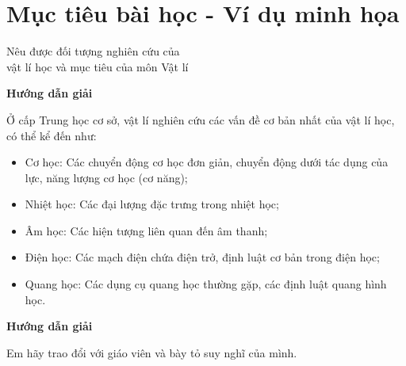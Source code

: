 \section{Mục tiêu bài học - Ví dụ minh họa}
\begin{dang}{Nêu được đối tượng nghiên cứu của\\ vật lí học và mục tiêu của môn Vật lí}
	{	\begin{center}
			\textbf{Hướng dẫn giải}
		\end{center}
		
		Ở cấp Trung học cơ sở, vật lí nghiên cứu các vấn đề cơ bản nhất của vật lí học, có thể kể đến như:
		\begin{itemize}
			\item Cơ học: Các chuyển động cơ học đơn giản, chuyển động dưới tác dụng của lực, năng lượng cơ học (cơ năng);
			\item Nhiệt học: Các đại lượng đặc trưng trong nhiệt học;
			\item Âm học: Các hiện tượng liên quan đến âm thanh;
			\item Điện học: Các mạch điện chứa điện trở, định luật cơ bản trong điện học;
			\item Quang học: Các dụng cụ quang học thường gặp, các định luật quang hình học.
		\end{itemize}
	}
	{	\begin{center}
			\textbf{Hướng dẫn giải}
		\end{center}
		
		Em hãy trao đổi với giáo viên và bày tỏ suy nghĩ của mình.
	}
\end{dang}

